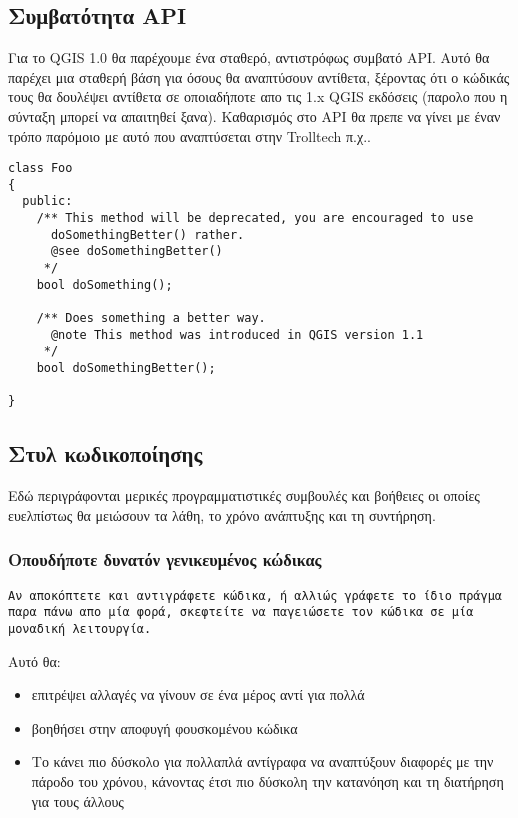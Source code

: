 \hypertarget{toc21}{}
\subsection{Συμβατότητα API}
Για το QGIS 1.0 θα παρέχουμε ένα σταθερό, αντιστρόφως συμβατό API. Αυτό θα παρέχει μια σταθερή βάση για όσους θα αναπτύσουν αντίθετα, ξέροντας ότι ο κώδικάς τους θα δουλέψει αντίθετα σε οποιαδήποτε απο τις 1.x QGIS εκδόσεις (παρολο που η σύνταξη μπορεί να απαιτηθεί ξανα). Καθαρισμός στο API θα πρεπε να γίνει με έναν τρόπο παρόμοιο με αυτό που αναπτύσεται στην Trolltech π.χ..

\begin{verbatim}
class Foo 
{
  public:
    /** This method will be deprecated, you are encouraged to use 
      doSomethingBetter() rather.
      @see doSomethingBetter()
     */
    bool doSomething();

    /** Does something a better way.
      @note This method was introduced in QGIS version 1.1
     */
    bool doSomethingBetter();

}
\end{verbatim}

\hypertarget{toc22}{}
\subsection{Στυλ κωδικοποίησης}
Εδώ περιγράφονται μερικές προγραμματιστικές συμβουλές και βοήθειες οι οποίες ευελπίστως θα μειώσουν τα λάθη, το χρόνο ανάπτυξης και τη συντήρηση.

\hypertarget{toc23}{}
\subsubsection{Οπουδήποτε δυνατόν γενικευμένος κώδικας}
\begin{verbatim}
Αν αποκόπτετε και αντιγράφετε κώδικα, ή αλλιώς γράφετε το ίδιο πράγμα παρα πάνω απο μία φορά, σκεφτείτε να παγειώσετε τον κώδικα σε μία μοναδική λειτουργία.
\end{verbatim}

Αυτό θα:

\begin{itemize}
\item επιτρέψει αλλαγές να γίνουν σε ένα μέρος αντί για πολλά
\item βοηθήσει στην αποφυγή φουσκομένου κώδικα
\item Το κάνει πιο δύσκολο για πολλαπλά αντίγραφα να αναπτύξουν διαφορές με την πάροδο του χρόνου, κάνοντας έτσι πιο δύσκολη την κατανόηση και τη διατήρηση για τους άλλους
\end{itemize}


